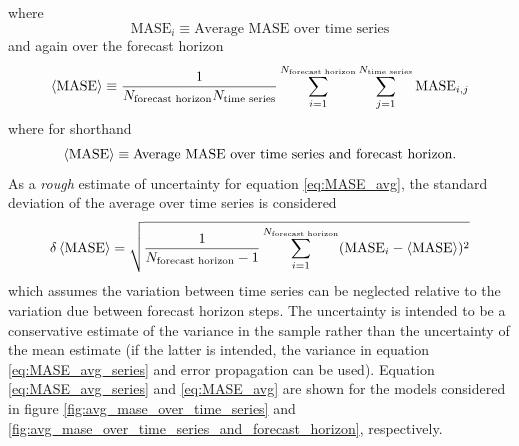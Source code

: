 where
\begin{equation}
	\text{MASE}_i \equiv \text{Average MASE over time series}
\end{equation}
and again over the forecast horizon
\begin{equation}
	\braket{\text{MASE}}\equiv \frac{1}{N_{\text{forecast horizon}}N_{\text{time series}}}\sum_{i=1}^{N_{\text{forecast horizon}}}\sum_{j=1}^{N_{\text{time series}}} \text{MASE}_{i,j}
\end{equation}
where for shorthand
\begin{equation}
	\braket{\text{MASE}} \equiv \text{Average MASE over time series and forecast horizon}.
	\label{eq:MASE_avg}
\end{equation}
As a \emph{rough} estimate of uncertainty for equation \eqref{eq:MASE_avg}, the standard deviation of the average over time series is considered
\begin{equation}
	\delta\braket{\text{MASE}} = \sqrt{\frac{1}{N_{\text{forecast horizon}}-1} \sum_{i=1}^{N_{\text{forecast horizon}}} (\text{MASE}_i - \braket{\text{MASE}})^2}
\end{equation}
which assumes the variation between time series can be neglected relative to the variation due between forecast horizon steps. The uncertainty is intended to be a conservative estimate of the variance in the sample rather than the uncertainty of the mean estimate (if the latter is intended, the variance in equation \eqref{eq:MASE_avg_series} and error propagation can be used). Equation \eqref{eq:MASE_avg_series} and \eqref{eq:MASE_avg} are shown for the models considered in figure \ref{fig:avg_mase_over_time_series} and \ref{fig:avg_mase_over_time_series_and_forecast_horizon}, respectively.